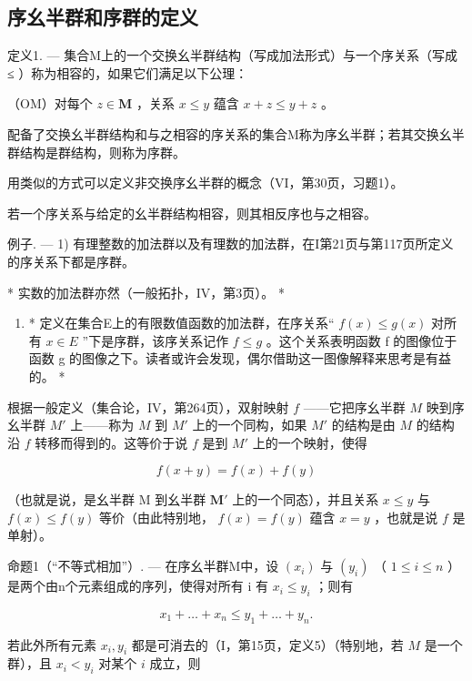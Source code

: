 \subsection{序幺半群和序群的定义}

定义1. --- 集合M上的一个交换幺半群结构（写成加法形式）与一个序关系（写成 ≤ ）称为相容的，如果它们满足以下公理：

（OM）对每个 \(z \in \mathbf{M}\) ，关系 \(x \leqslant y\) 蕴含 \(x + z \leqslant y + z\) 。

配备了交换幺半群结构和与之相容的序关系的集合M称为序幺半群；若其交换幺半群结构是群结构，则称为序群。

用类似的方式可以定义非交换序幺半群的概念（VI，第30页，习题1）。

若一个序关系与给定的幺半群结构相容，则其相反序也与之相容。

例子. --- 1) 有理整数的加法群以及有理数的加法群，在I第21页与第117页所定义的序关系下都是序群。

* 实数的加法群亦然（一般拓扑，IV，第3页）。 *

\begin{enumerate}
\def\labelenumi{\arabic{enumi})}
\setcounter{enumi}{1}
\tightlist
\item
  * 定义在集合E上的有限数值函数的加法群，在序关系“ \(f(x) \leq g(x)\) 对所有 \(x \in E\) ”下是序群，该序关系记作 \(f \leq g\) 。这个关系表明函数 f 的图像位于函数 g 的图像之下。读者或许会发现，偶尔借助这一图像解释来思考是有益的。 *
\end{enumerate}

根据一般定义（集合论，IV，第264页），双射映射 \(f\) ——它把序幺半群 \(M\) 映到序幺半群 \(M'\) 上——称为 \(M\) 到 \(M'\) 上的一个同构，如果 \(M'\) 的结构是由 \(M\) 的结构沿 \(f\) 转移而得到的。这等价于说 \(f\) 是到 \(M'\) 上的一个映射，使得

\[
f (x + y) = f (x) + f (y)
\]

（也就是说，是幺半群 M 到幺半群 \(\mathbf{M}'\) 上的一个同态），并且关系 \(x \leqslant y\) 与 \(f(x) \leqslant f(y)\) 等价（由此特别地， \(f(x) = f(y)\) 蕴含 \(x = y\) ，也就是说 \(f\) 是单射）。

命题1（“不等式相加”）. --- 在序幺半群M中，设 \((x_{i})\) 与 \((y_{i})\) （ \(1 \leqslant i \leqslant n\) ）是两个由n个元素组成的序列，使得对所有 i 有 \(x_{i} \leqslant y_{i}\) ；则有

\[
x _ {1} + \dots + x _ {n} \leqslant y _ {1} + \dots + y _ {n}.
\]

若此外所有元素 \(x_{i}, y_{i}\) 都是可消去的（I，第15页，定义5）（特别地，若 \(M\) 是一个群），且 \(x_{i} < y_{i}\) 对某个 \(i\) 成立，则


